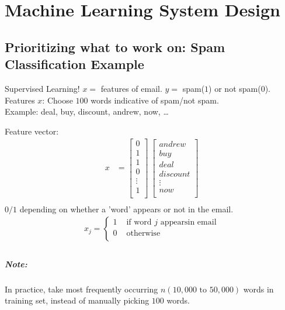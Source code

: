 \chapter{Machine Learning System Design}
\section{Prioritizing what to work on: Spam Classification Example}
Supervised Learning! $x =$ features of email. $y =$ spam($1$) or not spam($0$).\\
Features $x$: Choose $100$ words indicative of spam/not spam.\\
Example: deal, buy, discount, andrew, now, \dots

Feature vector:
\begin{align*}
	x & = \begin{bmatrix}
		0      \\
		1      \\
		1      \\
		0      \\
		\vdots \\
		1      \\
	\end{bmatrix}\
	\begin{bmatrix}
		andrew   \\
		buy      \\
		deal     \\
		discount \\
		\vdots   \\
		now      \\
	\end{bmatrix}        \\
\end{align*}
$0/1$ depending on whether a 'word' appears or not in the email.
\begin{align*}
	x_j = \begin{cases}
		1 & \text{ if word $j$ appearsin email} \\
		0 & \text{ otherwise}                   \\
	\end{cases} \\
\end{align*}

\paragraph{Note:} In practice, take most frequently occurring $n (10,000 \text{ to } 50,000)$
words in training set, instead of manually picking $100$ words.

